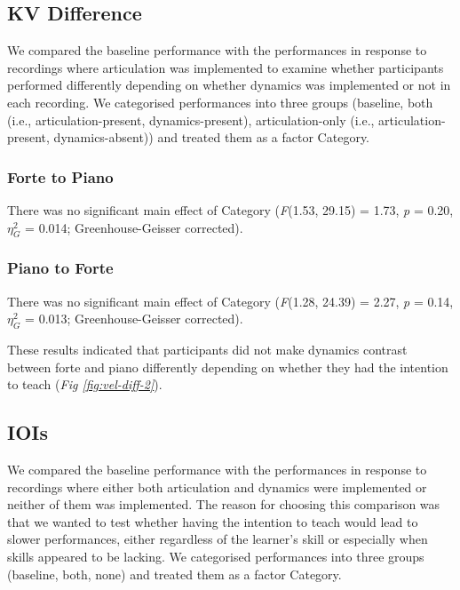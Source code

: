 \documentclass[
  man,floatsintext]{apa6}
\begin{document}
\hypertarget{kv-difference-1}{%
\subsection{KV Difference}\label{kv-difference-1}}

We compared the baseline performance with the performances in response to recordings where articulation was implemented to examine whether participants performed differently depending on whether dynamics was implemented or not in each recording. We categorised performances into three groups (baseline, both (i.e., articulation-present, dynamics-present), articulation-only (i.e., articulation-present, dynamics-absent)) and treated them as a factor Category.

\hypertarget{forte-to-piano-1}{%
\subsubsection{Forte to Piano}\label{forte-to-piano-1}}

There was no significant main effect of Category (\emph{F}(1.53, 29.15) = 1.73, \emph{p} = 0.20, \(\eta_G^2\) = 0.014; Greenhouse-Geisser corrected).

\hypertarget{piano-to-forte-1}{%
\subsubsection{Piano to Forte}\label{piano-to-forte-1}}

There was no significant main effect of Category (\emph{F}(1.28, 24.39) = 2.27, \emph{p} = 0.14, \(\eta_G^2\) = 0.013; Greenhouse-Geisser corrected).

These results indicated that participants did not make dynamics contrast between forte and piano differently depending on whether they had the intention to teach (\emph{Fig \ref{fig:vel-diff-2}}).

\hypertarget{iois-1}{%
\subsection{IOIs}\label{iois-1}}

We compared the baseline performance with the performances in response to recordings where either both articulation and dynamics were implemented or neither of them was implemented. The reason for choosing this comparison was that we wanted to test whether having the intention to teach would lead to slower performances, either regardless of the learner's skill or especially when skills appeared to be lacking. We categorised performances into three groups (baseline, both, none) and treated them as a factor Category.
\end{document}
